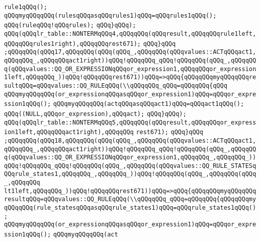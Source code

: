 \verb|rule1qQQq();|\newline
\verb|qQQqmyqQQqqQQq(rulesqQQqasqQQqrules1)qQQq=qQQqrules1qQQq();|\newline
\verb|qQQq(ruleqQQq!qQQqrules);|\newline
\verb|qQQq}qQQq);|\newline
\verb|qQQq(qQQqlr_table::NONTERMqQQq4,qQQqqQQq(qQQqresult,qQQqqQQqrule1left,qQQqqQQqrules1right),qQQqqQQqrest671);|\newline
\verb|qQQq}qQQq|\newline
\verb|;qQQqqQQq(qQQq17,qQQqqQQq(qQQq(qQQq_,qQQqqQQq(qQQqvalues::ACTqQQqact1,qQQqqQQq_,qQQqqQQqact1right))qQQq!qQQqqQQq_qQQq!qQQqqQQq(qQQq_,qQQqqQQq(qQQqvalues::QQ_OR_EXPRESSIONqQQqor_expression1,qQQqqQQqor_expression1left,qQQqqQQq_))qQQq!qQQqqQQqrest671))qQQq=>qQQq{qQQqqQQqmyqQQqqQQqresultqQQq=qQQqvalues::QQ_RULEqQQq(\\qQQqqQQq_qQQq=qQQqqQQq{qQQq|\newline
\verb|qQQqmyqQQqqQQq(or_expressionqQQqasqQQqor_expression1)qQQq=qQQqor_expression1qQQq();|\newline
\verb|qQQqmyqQQqqQQq(actqQQqasqQQqact1)qQQq=qQQqact1qQQq();|\newline
\verb|qQQq((NULL,qQQqor_expression),qQQqact);|\newline
\verb|qQQq}qQQq);|\newline
\verb|qQQq(qQQqlr_table::NONTERMqQQq5,qQQqqQQq(qQQqresult,qQQqqQQqor_expression1left,qQQqqQQqact1right),qQQqqQQq|\newline
\verb|rest671);|\newline
\verb|qQQq}qQQq|\newline
\verb|;qQQqqQQq(qQQq18,qQQqqQQq(qQQq(qQQq_,qQQqqQQq(qQQqvalues::ACTqQQqact1,qQQqqQQq_,qQQqqQQqact1right))qQQq!qQQqqQQq_qQQq!qQQqqQQq(qQQq_,qQQqqQQq(qQQqvalues::QQ_OR_EXPRESSIONqQQqor_expression1,qQQqqQQq_,qQQqqQQq_))qQQq!qQQqqQQq_qQQq!qQQqqQQq(qQQq_,qQQqqQQq(qQQqvalues::QQ_RULE_STATESqQQqrule_states1,qQQqqQQq_,qQQqqQQq_))qQQq!qQQqqQQq(qQQq_,qQQqqQQq(qQQq_,qQQqqQQq|\newline
\verb|lt1left,qQQqqQQq_))qQQq!qQQqqQQqrest671))qQQq=>qQQq{qQQqqQQqmyqQQqqQQqresultqQQq=qQQqvalues::QQ_RULEqQQq(\\qQQqqQQq_qQQq=qQQqqQQq{qQQqqQQqmyqQQqqQQq(rule_statesqQQqasqQQqrule_states1)qQQq=qQQqrule_states1qQQq();|\newline
\verb|qQQqmyqQQqqQQq(or_expressionqQQqasqQQqor_expression1)qQQq=qQQqor_expression1qQQq();|\newline
\verb|qQQqmyqQQqqQQq(act|\newline
